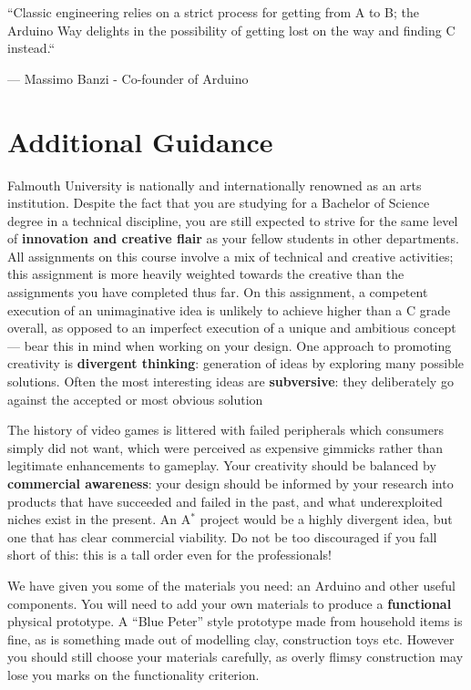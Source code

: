 \documentclass{../fal_assignment}
\begin{document}
\begin{marginquote}
    ``Classic engineering relies on a strict process for getting from A to B; the Arduino Way delights in the possibility of getting lost on the way and finding C instead.``
    
   
    --- Massimo Banzi - Co-founder of Arduino
\end{marginquote}

\section*{Additional Guidance}

Falmouth University is nationally and internationally renowned as an arts institution.
Despite the fact that you are studying for a Bachelor of Science degree in a technical discipline,
you are still expected to strive for the same level of \textbf{innovation and creative flair}
as your fellow students in other departments.
All assignments on this course involve a mix of technical and creative activities;
this assignment is more heavily weighted towards the creative than the assignments you have completed thus far.
On this assignment, a competent execution of an unimaginative idea is unlikely to achieve higher than a C grade overall,
as opposed to an imperfect execution of a unique and ambitious concept
--- bear this in mind when working on your design.
One approach to promoting creativity is
\textbf{divergent thinking}: generation of ideas by exploring many possible solutions.
Often the most interesting ideas are \textbf{subversive}: they deliberately go against the
accepted or most obvious solution

The history of video games is littered with failed peripherals which consumers simply did not want,
which were perceived as expensive gimmicks rather than legitimate enhancements to gameplay.
Your creativity should be balanced by \textbf{commercial awareness}:
your design should be informed by your research into products that have succeeded and failed
in the past, and what underexploited niches exist in the present.
An A$^*$ project would be a highly divergent idea, but one that has clear commercial viability.
Do not be too discouraged if you fall short of this: this is a tall order even for the professionals!

We have given you some of the materials you need: an Arduino and other useful components.
You will need to add your own materials to produce a \textbf{functional} physical prototype.
A ``Blue Peter'' style prototype made from household items is fine,
as is something made out of modelling clay, construction toys etc.
However you should still choose your materials carefully, as overly flimsy construction may
lose you marks on the functionality criterion.
\end{document}
